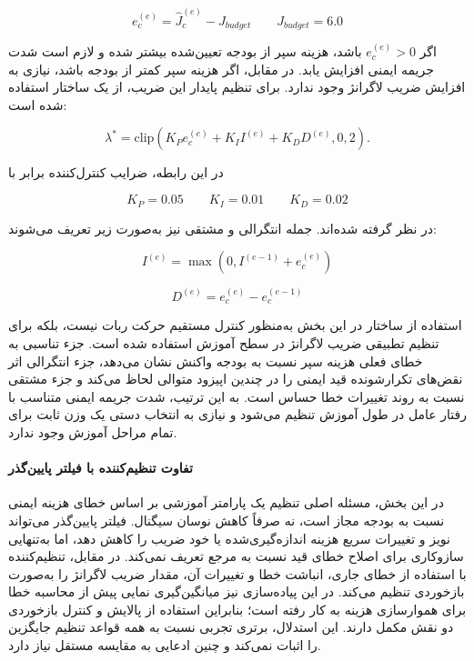 \begin{equation}
	e_c^{(e)} =
	\hat{J}^{(e)}_c
	-
	J_{budget}
	\qquad
	J_{budget}=6.0
	\label{eq:shield_constraint_error_final}
\end{equation}

اگر \(e_c^{(e)}>0\) باشد، هزینه سپر از بودجه تعیین‌شده بیشتر شده و لازم است شدت جریمه ایمنی افزایش یابد. در مقابل، اگر هزینه سپر کمتر از بودجه باشد، نیازی به افزایش ضریب لاگرانژ وجود ندارد. برای تنظیم پایدار این ضریب، از یک ساختار  استفاده شده است:

\begin{equation}
	\lambda^{*} =
	\mathrm{clip}
	\left(
	K_P e_c^{(e)}
	+
	K_I I^{(e)}
	+
	K_D D^{(e)},
	0,
	2
	\right).
	\label{eq:pid_lambda_raw_final}
\end{equation}

در این رابطه، ضرایب کنترل‌کننده برابر با

\begin{equation}
	K_P=0.05
	\qquad
	K_I=0.01
	\qquad
	K_D=0.02
	\label{eq:pid_gains_final}
\end{equation}

در نظر گرفته شده‌اند. جمله انتگرالی و مشتقی نیز به‌صورت زیر تعریف می‌شوند:

\begin{equation}
	I^{(e)}
	=
	\max
	\left(
	0,
	I^{(e-1)}+e_c^{(e)}
	\right)
	\label{eq:pid_integral_final}
\end{equation}

\begin{equation}
	D^{(e)}
	=
	e_c^{(e)}
	-
	e_c^{(e-1)}
	\label{eq:pid_derivative_final}
\end{equation}

استفاده از ساختار  در این بخش به‌منظور کنترل مستقیم حرکت ربات نیست، بلکه برای تنظیم تطبیقی ضریب لاگرانژ در سطح آموزش استفاده شده است. جزء تناسبی به خطای فعلی هزینه سپر نسبت به بودجه واکنش نشان می‌دهد، جزء انتگرالی اثر نقض‌های تکرارشونده قید ایمنی را در چندین اپیزود متوالی لحاظ می‌کند و جزء مشتقی نسبت به روند تغییرات خطا حساس است. به این ترتیب، شدت جریمه ایمنی متناسب با رفتار عامل در طول آموزش تنظیم می‌شود و نیازی به انتخاب دستی یک وزن ثابت برای تمام مراحل آموزش وجود ندارد.

\paragraph{تفاوت تنظیم‌کننده  با فیلتر پایین‌گذر}
در این بخش، مسئله اصلی تنظیم یک پارامتر آموزشی بر اساس خطای هزینه ایمنی نسبت به بودجه مجاز است، نه صرفاً کاهش نوسان سیگنال. فیلتر پایین‌گذر می‌تواند نویز و تغییرات سریع هزینه اندازه‌گیری‌شده یا خود ضریب را کاهش دهد، اما به‌تنهایی سازوکاری برای اصلاح خطای قید نسبت به مرجع تعریف نمی‌کند. در مقابل، تنظیم‌کننده  با استفاده از خطای جاری، انباشت خطا و تغییرات آن، مقدار ضریب لاگرانژ را به‌صورت بازخوردی تنظیم می‌کند. در این پیاده‌سازی نیز میانگین‌گیری نمایی پیش از محاسبه خطا برای هموارسازی هزینه به کار رفته است؛ بنابراین استفاده از پالایش و کنترل بازخوردی دو نقش مکمل دارند. این استدلال، برتری تجربی  نسبت به همه قواعد تنظیم جایگزین را اثبات نمی‌کند و چنین ادعایی به مقایسه مستقل نیاز دارد.

